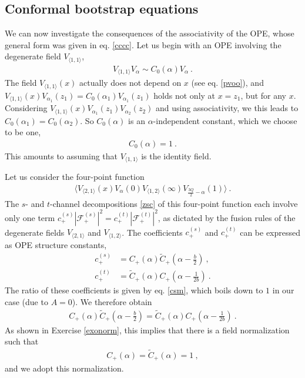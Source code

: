 \documentclass[12pt, a4paper, notitlepage, twoside]{report}
\numberwithin{equation}{section}
\theoremstyle{break}
\begin{document}
\subsection{Conformal bootstrap equations \label{seccbe}}

We can now investigate the consequences of the associativity of the OPE, whose general form was given in eq. \eqref{cccc}.
Let us begin with an OPE involving the degenerate field  $V_{\langle 1,1 \rangle}$,
\begin{align}
\boxed{V_{\langle 1,1 \rangle}V_\alpha \sim  C_0(\alpha) V_\alpha} \ .
\end{align}
The field $V_{\langle 1,1 \rangle}(x)$ actually does not depend on $x$ (see eq. \eqref{pvoo}), and $V_{\langle 1,1 \rangle}(x)V_{\alpha_1}(z_1) = C_0(\alpha_1) V_{\alpha_1}(z_1)$ holds not only at $x=z_1$, but for any $x$.
Considering  
$V_{\langle 1,1 \rangle}(x)V_{\alpha_1}(z_1)V_{\alpha_2}(z_2)$ and using associativity, we this leads to $C_0(\alpha_1)=C_0(\alpha_2)$.
So $C_0(\alpha)$ 
is an $\alpha$-independent constant, which we choose to be one,
\begin{align}
\boxed{ C_0(\alpha) = 1}\ .
\label{cza}
\end{align}
This amounts to assuming that $V_{\langle 1,1 \rangle}$ is the identity field. 

Let us consider the four-point function 
\begin{align}
 \Big\langle V_{\langle 2,1\rangle}(x) V_\alpha(0) V_{\langle 1, 2\rangle}(\infty) V_{\frac{3Q}{2}-\alpha}(1)\Big\rangle\ .
\end{align}
The $s$- and $t$-channel decompositions \eqref{zsc} of this four-point function each involve only one term $c_+^{(s)}\left|\mathcal{F}_+^{(s)}\right|^2 = c_+^{(t)}\left|\mathcal{F}_+^{(t)}\right|^2$, as dictated by the fusion rules of the degenerate fields $V_{\langle 2,1\rangle}$ and $V_{\langle 1, 2\rangle}$. 
The coefficients $c_+^{(s)}$ and $c_+^{(t)}$ can be expressed as OPE structure constants,
\begin{align}
 c_+^{(s)} &= C_+(\alpha)\tilde{C}_+(\alpha-\tfrac{b}{2}) \ ,
 \\
 c_+^{(t)} &= \tilde{C}_+(\alpha)C_+(\alpha-\tfrac{1}{2b})\ .
\end{align}
The ratio of these coefficients is given by eq. \eqref{csm}, which boils down to $1$ in our case (due to $A=0$). 
We therefore obtain 
\begin{align}
 C_+(\alpha)\tilde{C}_+(\alpha-\tfrac{b}{2}) = \tilde{C}_+(\alpha)C_+(\alpha-\tfrac{1}{2b})\ .
\label{ctc}
\end{align}
As shown in Exercise \ref{exonorm}, this implies that there is a field normalization such that 
\begin{align}
 \boxed{C_+(\alpha) = \tilde{C}_+(\alpha) = 1}\ ,
\label{cco}
\end{align}
and we adopt this normalization. 
\end{document}
